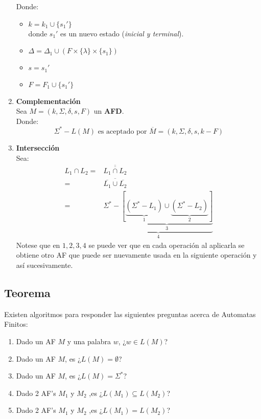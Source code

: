 \begin{enumerate}[label=\textbf{\alph*)}]
Donde:
\begin{itemize}
\item $k=k_1 \cup \{ s_1' \}$ \\
donde $s_1'$ es un nuevo estado (\textit{inicial y terminal}).
\item $\Delta=\Delta_1 \cup (F \times\{ \lambda \}\times \{ s_1\})$
\item $s=s_1'$
\item $F=F_1\cup\{ s_1' \}$
\end{itemize}
\item \textbf{Complementación} \\ ${ }$\\
Sea $M=(k,\Sigma,\delta,s,F)$ un \textbf{AFD}. \\
Donde:
$$
\Sigma^* - L(M) \text{ es aceptado por } \overline{M}=(k,\Sigma,\delta,s,k-F)
$$
\item \textbf{Intersección} \\ ${ }$\\
Sea:
\begin{align*}
L_1 \cap L_2 =& \overline{\overline{L_1 \cap L_2}} \\
		 =& \overline{\overline{L_1}\cup\overline{L_2}} \\
		 =& \underbrace{\Sigma^* - \underbrace{[ \underbrace{(\Sigma^* - L_1)}_{1}\cup \underbrace{(\Sigma^* -L_2)}_{2} ]}_{3}}_{4}
\end{align*}
Notese que en $1,2,3,4$ se puede ver que en cada operación al aplicarla se obtiene otro AF que puede ser nuevamente usada en la siguiente operación y así sucesivamente.
\end{enumerate}
\subsection*{Teorema}
Existen algoritmos para responder las siguientes preguntas acerca de Automatas Finitos:
\begin{enumerate}[label=\textbf{\alph*)}]
\item Dado un AF $M$ y una palabra $w$, ¿$w\in L(M)$?
\item Dado un AF $M$, es ¿$L(M)=\emptyset$?
\item Dado un AF $M$, es ¿$L(M)=\Sigma^*$?
\item Dado 2 AF's $M_1$ y $M_2$ ,es ¿$L(M_1)\subseteq L(M_2)$?
\item Dado 2 AF's $M_1$ y $M_2$ ,es ¿$L(M_1)= L(M_2)$?
\end{enumerate}
